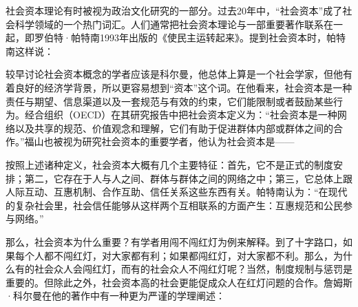 
社会资本理论有时被视为政治文化研究的一部分。过去20年中，“社会资本”成了社会科学领域的一个热门词汇。人们通常把社会资本理论与一部重要著作联系在一起，即罗伯特·帕特南1993年出版的《使民主运转起来》。提到社会资本时，帕特南这样说：


较早讨论社会资本概念的学者应该是科尔曼，他总体上算是一个社会学家，但他有着良好的经济学背景，所以更容易想到“资本”这个词。在他看来，社会资本是一种责任与期望、信息渠道以及一套规范与有效的约束，它们能限制或者鼓励某些行为。经合组织（OECD）在其研究报告中把社会资本定义为：“社会资本是一种网络以及共享的规范、价值观念和理解，它们有助于促进群体内部或群体之间的合作。”福山也被视为研究社会资本的重要学者，他认为社会资本是——


按照上述诸种定义，社会资本大概有几个主要特征：首先，它不是正式的制度安排；第二，它存在于人与人之间、群体与群体之间的网络之中；第三，它总体上跟人际互动、互惠机制、合作互助、信任关系这些东西有关。帕特南认为：“在现代的复杂社会里，社会信任能够从这样两个互相联系的方面产生：互惠规范和公民参与网络。”

那么，社会资本为什么重要？有学者用闯不闯红灯为例来解释。到了十字路口，如果每个人都不闯红灯，对大家都有利；如果都闯红灯，对大家都不利。那么，为什么有的社会众人会闯红灯，而有的社会众人不闯红灯呢？当然，制度规制与惩罚是重要的。但除此之外，社会资本高的社会更能促成众人在红灯问题的合作。詹姆斯·科尔曼在他的著作中有一种更为严谨的学理阐述：


